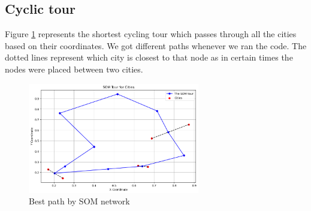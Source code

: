 \documentclass[a4paper]{article}
\begin{document}
\subsection{Cyclic tour}
Figure \ref{fig:SOM_cycle} represents the shortest cycling tour which passes through all the cities based on their coordinates. We got different paths whenever we ran the code. The dotted lines represent which city is closest to that node as in certain times the nodes were placed between two cities.  
\begin{figure}[htb]
    \centering
\includegraphics[width=7.5cm]{Labs/Lab 2/Results/Cyclic_som.png}
    \caption{Best path by SOM network}
    \label{fig:SOM_cycle}
\end{figure}
\end{document}
